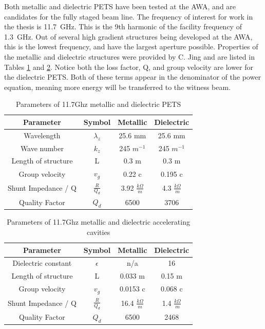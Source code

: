Both metallic and dielectric PETS have been tested at the AWA, 
and are candidates for the fully staged beam line. 
The frequency of interest for work in the thesis is \SI{11.7}{GHz}. 
This is the 9th harmonic of the facility frequency of \SI{1.3}{GHz}.
Out of several high gradient structures being developed at the AWA, 
this is the lowest frequency, and have the largest aperture possible. 
Properties of the metallic and dielectric structures were provided by C. Jing and are listed in 
Tables \ref{table:PETS} and \ref{table:acc}. 
Notice both the loss factor, Q, and group velocity are lower for the dielectric PETS. 
Both of these terms appear in the denominator of the power equation, meaning more
energy will be transferred to the witness beam.
\begin{table}
	\begin{center}
	\caption{Parameters of 11.7Ghz metallic and dielectric PETS}
	\label{table:PETS}
	
			\begin{tabular}{cccc}  
			\toprule
			\toprule
			\textbf{Parameter} & \textbf{Symbol} & \textbf{Metallic }& \textbf{Dielectric} \\
			\midrule
			Wavelength 	& $\lambda_{z}$ & 25.6 mm 	&  25.6 mm	\\  
			Wave number & $k_{z}$ 		& 245 $m^{-1}$ 	& 245 $m^{-1}$\\  
			Length of structure & L & 0.3 m & 0.3 m\\  
			Group velocity & $v_{g}$ & 0.22 c & 0.195 c\\  
			Shunt Impedance / Q & $\frac{R}{Q_{d}}$ & 3.92 $\frac{k\Omega}{m}$  & 4.3 $\frac{k\Omega}{m}$\\  
			Quality Factor & $Q_{d}$ & 6500 &3706\\  
			\bottomrule		
		\end{tabular}
\end{center}
\end{table}
\begin{table}
	\begin{center}
		\caption{Parameters of 11.7Ghz metallic and dielectric accelerating cavities}
		\label{table:acc}
		
		\begin{tabular}{cccc}  
			\toprule
			\toprule
			\textbf{Parameter} & \textbf{Symbol} & \textbf{Metallic }& \textbf{Dielectric} \\
			\midrule
			Dielectric constant & $\epsilon$ & n/a & 16 \\
			Length of structure & L & 0.033 m & 0.15 m\\  
			Group velocity & $v_{g}$ & 0.0153 c & 0.068 c\\  
			Shunt Impedance / Q & $\frac{R}{Q_{d}}$ & 16.4 $\frac{k\Omega}{m}$  & 1.4 $\frac{k\Omega}{m}$\\  
			Quality Factor & $Q_{d}$ & 6500  &2468\\  
			\bottomrule		
		\end{tabular}
	\end{center}
\end{table}

